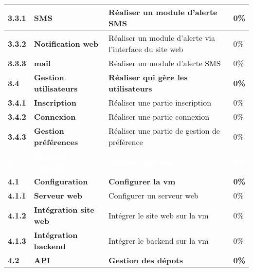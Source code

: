 \begin{supertabular}{|p{1.5cm} p{6cm}|p{5cm}|R{2cm}|}
  \hspace{6pt}
  \textbf{3.3.1}  & \textbf{SMS} & Réaliser un module d'alerte SMS  & 0\% \\
  \hline

  \hspace{6pt}
  \textbf{3.3.2}  & \textbf{Notification web} & Réaliser un module d'alerte via l'interface du site web & 0\% \\
  \hline

  \hspace{6pt}
  \textbf{3.3.3}  & \textbf{mail} & Réaliser un module d'alerte SMS & 0\% \\
  \hline


  \textbf{3.4}  & \textbf{Gestion utilisateurs} & \textbf{Réaliser qui gère les utilisateurs} & \textbf{0\%} \\
  \hline

  \hspace{6pt}
  \textbf{3.4.1}  & \textbf{Inscription} & Réaliser une partie inscription & 0\% \\
  \hline

  \hspace{6pt}
  \textbf{3.4.2}  & \textbf{Connexion} & Réaliser une partie connexion & 0\% \\
  \hline

  \hspace{6pt}
  \textbf{3.4.3}  & \textbf{Gestion préférences} & Réaliser une partie de gestion de préférence & 0\% \\
  \hline





  \textcolor{white}{\textbf{4}}  & \textcolor{white}{\textbf{Machine virtuelle}} & \textcolor{white}{\textbf{Réaliser une vm}} & \textcolor{white}{\textbf{0\%}} \\
  \hline

  \textbf{4.1}  & \textbf{Configuration} & \textbf{Configurer la vm} & \textbf{0\%} \\
  \hline

  \hspace{6pt}
  \textbf{4.1.1}  & \textbf{Serveur web} & Configurer un serveur web & 0\% \\
  \hline

  \hspace{6pt}
  \textbf{4.1.2}  & \textbf{Intégration site web} & Intégrer le site web sur la vm & 0\% \\
  \hline

  \hspace{6pt}
  \textbf{4.1.3}  & \textbf{Intégration backend} & Intégrer le backend sur la vm & 0\% \\
  \hline


  \textbf{4.2}  & \textbf{API} & \textbf{Gestion des dépots} & \textbf{0\%} \\
  \hline



\end{supertabular}
\normalsize
